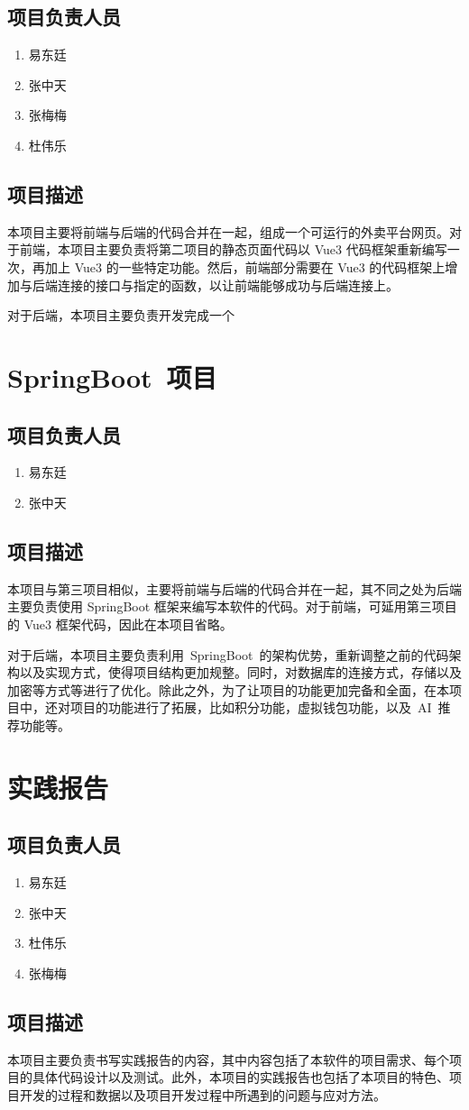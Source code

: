 \subsection{项目负责人员}
\begin{enumerate}
    \item{易东廷}
    \item{张中天}
    \item{张梅梅}
    \item{杜伟乐}
\end{enumerate}
\subsection{项目描述}
本项目主要将前端与后端的代码合并在一起，组成一个可运行的外卖平台网页。对于前端，本项目主要负责将第二项目的静态页面代码以 Vue3 代码框架重新编写一次，再加上 Vue3 的一些特定功能。然后，前端部分需要在 Vue3 的代码框架上增加与后端连接的接口与指定的函数，以让前端能够成功与后端连接上。

对于后端，本项目主要负责开发完成一个

\section{SpringBoot~项目}
\subsection{项目负责人员}
\begin{enumerate}
    \item{易东廷}
    \item{张中天}
\end{enumerate}
\subsection{项目描述}
本项目与第三项目相似，主要将前端与后端的代码合并在一起，其不同之处为后端主要负责使用 SpringBoot 框架来编写本软件的代码。对于前端，可延用第三项目的 Vue3 框架代码，因此在本项目省略。

对于后端，本项目主要负责利用~SpringBoot~的架构优势，重新调整之前的代码架构以及实现方式，使得项目结构更加规整。同时，对数据库的连接方式，存储以及加密等方式等进行了优化。除此之外，为了让项目的功能更加完备和全面，在本项目中，还对项目的功能进行了拓展，比如积分功能，虚拟钱包功能，以及~AI~推荐功能等。

\section{实践报告}
\subsection{项目负责人员}
\begin{enumerate}
    \item{易东廷}
    \item{张中天}
    \item{杜伟乐}
    \item{张梅梅}
\end{enumerate}
\subsection{项目描述}
本项目主要负责书写实践报告的内容，其中内容包括了本软件的项目需求、每个项目的具体代码设计以及测试。此外，本项目的实践报告也包括了本项目的特色、项目开发的过程和数据以及项目开发过程中所遇到的问题与应对方法。